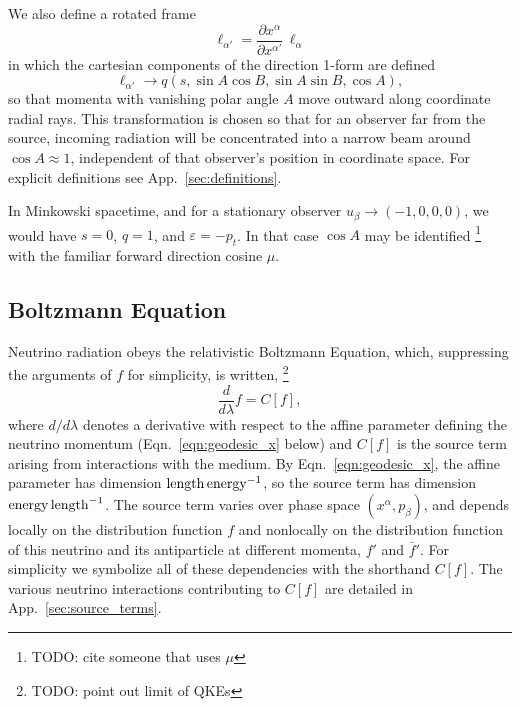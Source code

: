 \documentclass[aps,floatfix,prd,superscriptaddress,twocolumn]{revtex4-1}
\begin{document}
We also define a rotated frame
\begin{equation}
  \ell_{\alpha'}=\frac{\partial x^\alpha}{\partial x^{\alpha'}}\,\ell_\alpha \nonumber
\end{equation}
in which the cartesian components of the direction 1-form are defined
\begin{equation}
  \label{eqn:def_direction_primed}
  \ell_{\alpha'} \rightarrow
  q (s,\sin A \cos B,\sin A\sin B,\cos A),
\end{equation}
so that momenta with vanishing polar angle $A$ move outward along coordinate
radial rays.
This transformation is chosen so that for an observer far from the source,
incoming radiation will be concentrated into a narrow beam around $\cos A\approx1$,
independent of that observer's position in coordinate space.
For explicit definitions see App.~\ref{sec:definitions}.

In Minkowski spacetime, and for a stationary observer
$u_\beta\rightarrow(-1,0,0,0)$, we would have $s=0$, $q=1$,
and $\varepsilon=-p_t$. In that case $\cos A$ may be identified
\footnote{TODO: cite someone that uses $\mu$}
with the familiar forward direction cosine $\mu$.

\subsection{Boltzmann Equation}
\label{ssec:boltzmann}
Neutrino radiation obeys the relativistic Boltzmann Equation,
which, suppressing the arguments of $f$ for simplicity, is written,
\footnote{TODO: point out limit of QKEs}
\begin{equation}
  \label{eqn:boltzmann}
  \frac{d}{d\lambda}f = C[f],
\end{equation}
where $d/d\lambda$ denotes a derivative with respect to the affine
parameter defining the neutrino momentum (Eqn.~\ref{eqn:geodesic_x} below)
and $C[f]$ is the source term arising from interactions with the medium.
By Eqn.~\ref{eqn:geodesic_x},
the affine parameter has dimension ${\rm length}\,{\rm energy}^{-1}$,
so the source term has dimension ${\rm energy}\,{\rm length}^{-1}$.
The source term varies over phase space $(x^\alpha,p_\beta)$,
and depends locally on the distribution function $f$
and nonlocally on the distribution function of this neutrino and its
antiparticle at different momenta, $f'$ and $\bar{f}'$.
For simplicity we symbolize all of these dependencies with the shorthand $C[f]$.
The various neutrino interactions contributing to $C[f]$ are detailed in
App.~\ref{sec:source_terms}.
\end{document}
